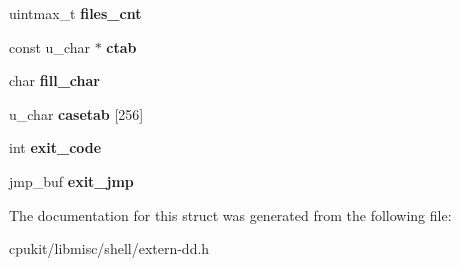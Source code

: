 \begin{DoxyCompactItemize}
uintmax\+\_\+t {\bfseries files\+\_\+cnt}
\item 
\mbox{\label{structrtems__shell__dd__globals__t_ac5adca078bdd5c978cd0589d4c34f92f}} 
const u\+\_\+char $\ast$ {\bfseries ctab}
\item 
\mbox{\label{structrtems__shell__dd__globals__t_aa88f7f01dc2fca28a940f9da18aaa837}} 
char {\bfseries fill\+\_\+char}
\item 
\mbox{\label{structrtems__shell__dd__globals__t_a038d0507c8f9641678eebae93c1a9daa}} 
u\+\_\+char {\bfseries casetab} \mbox{[}256\mbox{]}
\item 
\mbox{\label{structrtems__shell__dd__globals__t_a07a63600be4f980d2cc9ea66c769d688}} 
int {\bfseries exit\+\_\+code}
\item 
\mbox{\label{structrtems__shell__dd__globals__t_a56c3a5fe7f531f33c72814d7495b9371}} 
jmp\+\_\+buf {\bfseries exit\+\_\+jmp}
\end{DoxyCompactItemize}


The documentation for this struct was generated from the following file\+:\begin{DoxyCompactItemize}
\item 
cpukit/libmisc/shell/extern-\/dd.\+h\end{DoxyCompactItemize}
